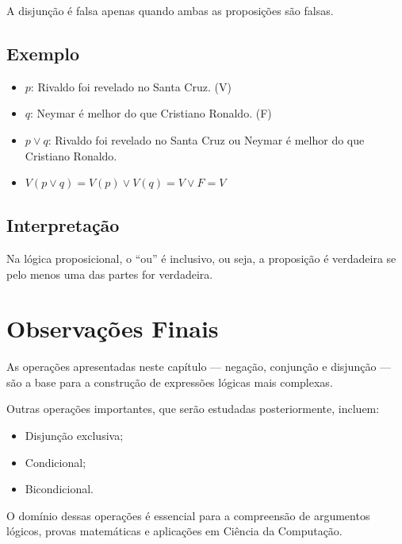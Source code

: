 A disjunção é falsa apenas quando ambas as proposições são falsas.

\subsection{Exemplo}
\begin{itemize}
    \item $p$: Rivaldo foi revelado no Santa Cruz. \hspace*{0.5cm} (V)
    \item $q$: Neymar é melhor do que Cristiano Ronaldo. \hspace*{0.5cm} (F)

    \item $p \vee q$: Rivaldo foi revelado no Santa Cruz ou Neymar é melhor do que Cristiano Ronaldo.

    \item $V(p \vee q) = V(p) \vee V(q) = V \vee F = V$
\end{itemize}

\subsection{Interpretação}
Na lógica proposicional, o ``ou'' é inclusivo, ou seja, a proposição é verdadeira se pelo menos uma das partes for verdadeira.

\section{Observações Finais}

As operações apresentadas neste capítulo — negação, conjunção e disjunção — são a base para a construção de expressões lógicas mais complexas.

Outras operações importantes, que serão estudadas posteriormente, incluem:
\begin{itemize}
    \item Disjunção exclusiva;
    \item Condicional;
    \item Bicondicional.
\end{itemize}

O domínio dessas operações é essencial para a compreensão de argumentos lógicos, provas matemáticas e aplicações em Ciência da Computação.